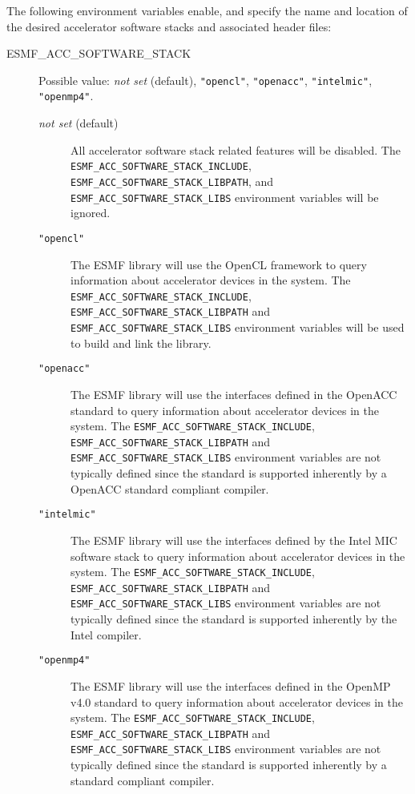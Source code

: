 The following environment variables enable, and specify the name and location
of the desired accelerator software stacks and associated header files:

\begin{description}

\item[ESMF\_ACC\_SOFTWARE\_STACK] Possible value:
{\it not set} (default), {\tt "opencl"}, {\tt "openacc"},
{\tt "intelmic"}, {\tt "openmp4"}.

\begin{description}
\item[{\it not set} (default)] All accelerator software stack related features
 will be disabled.
The {\tt ESMF\_ACC\_SOFTWARE\_STACK\_INCLUDE},
{\tt ESMF\_ACC\_SOFTWARE\_STACK\_LIBPATH}, and
{\tt ESMF\_ACC\_SOFTWARE\_STACK\_LIBS} environment variables will be ignored.

\item[{\tt "opencl"}] The ESMF library will use the OpenCL
framework to query information about accelerator devices in the system.
The {\tt ESMF\_ACC\_SOFTWARE\_STACK\_INCLUDE},
{\tt ESMF\_ACC\_SOFTWARE\_STACK\_LIBPATH} and
{\tt ESMF\_ACC\_SOFTWARE\_STACK\_LIBS} environment variables will be used
to build and link the library.

\item[{\tt "openacc"}] The ESMF library will use the interfaces defined
in the OpenACC standard to query information about accelerator devices
in the system.
The {\tt ESMF\_ACC\_SOFTWARE\_STACK\_INCLUDE},
{\tt ESMF\_ACC\_SOFTWARE\_STACK\_LIBPATH} and
{\tt ESMF\_ACC\_SOFTWARE\_STACK\_LIBS} environment variables are not typically
defined since the standard is supported inherently by a OpenACC standard
compliant compiler.

\item[{\tt "intelmic"}] The ESMF library will use the interfaces defined
by the Intel MIC software stack to query information about accelerator devices
in the system.
The {\tt ESMF\_ACC\_SOFTWARE\_STACK\_INCLUDE},
{\tt ESMF\_ACC\_SOFTWARE\_STACK\_LIBPATH} and
{\tt ESMF\_ACC\_SOFTWARE\_STACK\_LIBS} environment variables are not typically
defined since the standard is supported inherently by the Intel compiler.

\item[{\tt "openmp4"}] The ESMF library will use the interfaces defined
in the OpenMP v4.0 standard to query information about accelerator devices
in the system.
The {\tt ESMF\_ACC\_SOFTWARE\_STACK\_INCLUDE},
{\tt ESMF\_ACC\_SOFTWARE\_STACK\_LIBPATH} and
{\tt ESMF\_ACC\_SOFTWARE\_STACK\_LIBS} environment variables are not typically
defined since the standard is supported inherently by a standard compliant
compiler.


\end{description}
\end{description}
